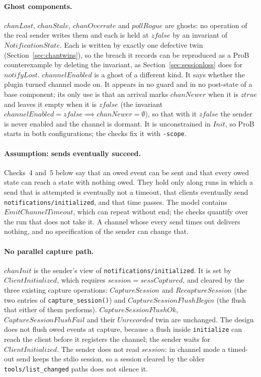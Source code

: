 \documentclass[a4paper,10pt,fleqn]{article}
\begin{document}
\paragraph{Ghost components.}  $chanLost$, $chanStale$, $chanOverrate$ and
$pollRogue$ are ghosts: no operation of the real sender writes them and
each is held at $zfalse$ by an invariant of $NotificationState$.  Each is
written by exactly one defective twin (Section~\ref{sec:chantwins}), so the
breach it records can be reproduced as a ProB counterexample by deleting the
invariant, as Section~\ref{sec:sessionloss} does for $notifyLost$.
$channelEnabled$ is a ghost of a different kind.  It says whether the plugin
turned channel mode on.  It appears in no guard and in no post-state of a
base component; its only use is that an arrival marks $chanNewer$ when it is
$ztrue$ and leaves it empty when it is $zfalse$ (the invariant
$channelEnabled = zfalse \implies chanNewer = \emptyset$), so that with it
$zfalse$ the sender is never enabled and the channel is dormant.  It is
unconstrained in $Init$, so ProB starts in both configurations; the checks
fix it with \texttt{-scope}.

\paragraph{Assumption: sends eventually succeed.}  Checks~4 and~5 below say
that an owed event can be sent and that every owed state can reach a state
with nothing owed.  They hold only along runs in which a send that is
attempted is eventually not a timeout, that clients eventually send
\texttt{notifications/initialized}, and that time passes.  The model contains
$EmitChannelTimeout$, which can repeat without end; the checks quantify over
the run that does not take it.  A channel whose every send times out
delivers nothing, and no specification of the sender can change that.

\paragraph{No parallel capture path.}  $chanInit$ is the sender's view of
\texttt{notifications/initialized}.  It is set by $ClientInitialized$, which
requires $session = sessCaptured$, and cleared by the three existing capture
operations: $CaptureSession$ and $RecaptureSession$ (the two entries of
\texttt{capture\_session()}) and $CaptureSessionFlushBegin$ (the flush that
either of them performs).  $CaptureSessionFlushOk$,
$CaptureSessionFlushFail$ and their $Unrecorded$ twin are unchanged.  The
design does not flush owed events at capture, because a flush inside
\texttt{initialize} can reach the client before it registers the channel;
the sender waits for $ClientInitialized$.  The sender does not read
$session$: in channel mode a timed-out send keeps the stdio session,
so a session cleared by the older \texttt{tools/list\_changed} paths does not
silence it.
\end{document}
